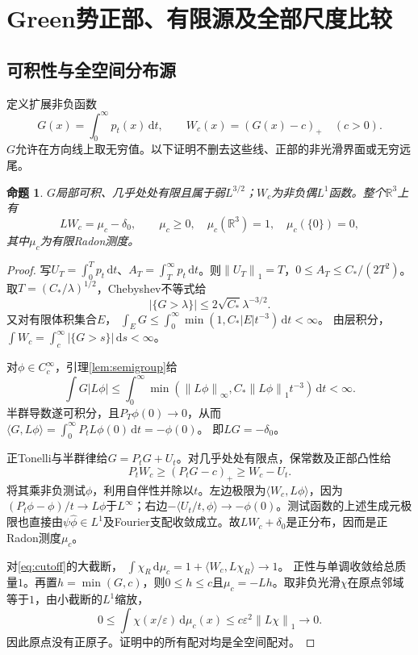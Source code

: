 \documentclass[UTF8,11pt,a4paper,fontset=fandol]{ctexart}
\newtheorem{proposition}[theorem]{命题}
\theoremstyle{definition}\newtheorem{definition}[theorem]{定义}
\theoremstyle{remark}\newtheorem{remark}[theorem]{注}
\newcommand{\R}{\mathbb R}
\newcommand{\dd}{\,\mathrm d}
\newcommand{\norm}[1]{\left\lVert#1\right\rVert}
\newcommand{\abs}[1]{\left|#1\right|}
\newcommand{\pos}[1]{(#1)_+}
\begin{document}
\section{Green势正部、有限源及全部尺度比较}
\subsection{可积性与全空间分布源}
定义扩展非负函数
\begin{equation}\label{eq:Green}
 G(x)=\int_0^\infty p_t(x)\dd t,
 \qquad W_c(x)=\pos{G(x)-c}\quad(c>0).
\end{equation}
$G$允许在方向线上取无穷值。以下证明不删去这些线、正部的非光滑界面或无穷远尾。

\begin{proposition}\label{prop:source}
$G$局部可积、几乎处处有限且属于弱$L^{3/2}$；$W_c$为非负偶$L^1$函数。整个$\R^3$上有
\begin{equation}\label{eq:source}
 LW_c=\mu_c-\delta_0,
 \qquad \mu_c\ge0,\quad\mu_c(\R^3)=1,\quad\mu_c(\{0\})=0,
\end{equation}
其中$\mu_c$为有限Radon测度。
\end{proposition}
\begin{proof}
写$U_T=\int_0^Tp_t\dd t$、$A_T=\int_T^\infty p_t\dd t$。则$\norm{U_T}_1=T$，$0\le A_T\le C_*/(2T^2)$。取$T=(C_*/\lambda)^{1/2}$，Chebyshev不等式给
\[
 \abs{\{G>\lambda\}}\le 2\sqrt{C_*}\lambda^{-3/2}.
\]
又对有限体积集合$E$，
$\int_EG\le\int_0^\infty\min(1,C_*\abs E t^{-3})\dd t<\infty$。
由层积分，$\int W_c=\int_c^\infty\abs{\{G>s\}}\dd s<\infty$。

对$\phi\in C_c^\infty$，引理\ref{lem:semigroup}给
\[
 \int G\abs{L\phi}
 \le\int_0^\infty\min(\norm{L\phi}_\infty,
 C_*\norm{L\phi}_1t^{-3})\dd t<\infty.
\]
半群导数遂可积分，且$P_T\phi(0)\to0$，从而
$\langle G,L\phi\rangle=\int_0^\infty P_tL\phi(0)\dd t=-\phi(0)$。
即$LG=-\delta_0$。

正Tonelli与半群律给$G=P_tG+U_t$。对几乎处处有限点，保常数及正部凸性给
\[
 P_tW_c\ge(P_tG-c)_+\ge W_c-U_t.
\]
将其乘非负测试$\phi$，利用自伴性并除以$t$。左边极限为$\langle W_c,L\phi\rangle$，因为$(P_t\phi-\phi)/t\to L\phi$于$L^\infty$；右边$-\langle U_t/t,\phi\rangle\to-\phi(0)$。测试函数的上述生成元极限也直接由$\psi\widehat\phi\in L^1$及Fourier支配收敛成立。故$LW_c+\delta_0$是正分布，因而是正Radon测度$\mu_c$。

对\eqref{eq:cutoff}的大截断，
$\int\chi_R\dd\mu_c=1+\langle W_c,L\chi_R\rangle\to1$。
正性与单调收敛给总质量$1$。再置$h=\min(G,c)$，则$0\le h\le c$且$\mu_c=-Lh$。取非负光滑$\chi$在原点邻域等于$1$，由小截断的$L^1$缩放，
\[
 0\le\int\chi(x/\varepsilon)\dd\mu_c(x)
 \le c\varepsilon^2\norm{L\chi}_1\longrightarrow0.
\]
因此原点没有正原子。证明中的所有配对均是全空间配对。
\end{proof}
\end{document}
